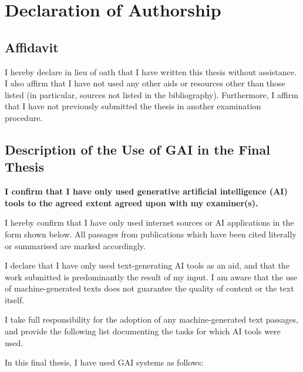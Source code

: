 
\chapter*{Declaration of Authorship}


\section*{Affidavit}

I hereby declare in lieu of oath that I have written this thesis without
assistance. I also affirm that I have not used any other aids or resources
other than those listed (in particular, sources not listed in the
bibliography). Furthermore, I affirm that I have not previously submitted the
thesis in another examination procedure.


\section*{Description of the Use of GAI in the Final Thesis}

\textbf{I confirm that I have only used generative artificial intelligence
(AI) tools to the agreed extent agreed upon with my examiner(s).}

\noindent I hereby confirm that I have only used internet sources or AI
applications in the form shown below. All passages from publications which have
been cited literally or summarised are marked accordingly.

\noindent I declare that I have only used text-generating AI tools as an aid,
and that the work submitted is predominantly the result of my input. I am aware
that the use of machine-generated texts does not guarantee the quality of
content or the text itself.

\noindent I take full responsibility for the adoption of any machine-generated
text passages, and provide the following list documenting the tasks for which AI
tools were used.

\bigskip
\noindent In this final thesis, I have used GAI systems as follows:

